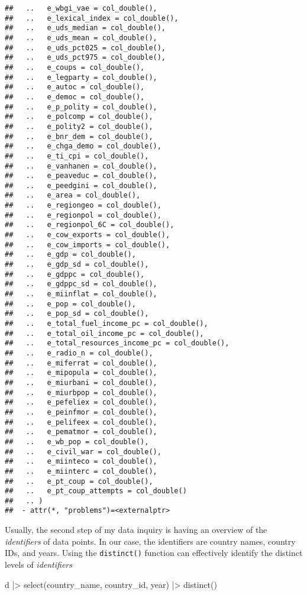 \documentclass[
]{article}
\newenvironment{Shaded}{\begin{snugshade}}{\end{snugshade}}
\newcommand{\FunctionTok}[1]{\textcolor[rgb]{0.00,0.00,0.00}{#1}}
\newcommand{\NormalTok}[1]{#1}
\newcommand{\SpecialCharTok}[1]{\textcolor[rgb]{0.00,0.00,0.00}{#1}}
\begin{document}
\begin{verbatim}
##   ..   e_wbgi_vae = col_double(),
##   ..   e_lexical_index = col_double(),
##   ..   e_uds_median = col_double(),
##   ..   e_uds_mean = col_double(),
##   ..   e_uds_pct025 = col_double(),
##   ..   e_uds_pct975 = col_double(),
##   ..   e_coups = col_double(),
##   ..   e_legparty = col_double(),
##   ..   e_autoc = col_double(),
##   ..   e_democ = col_double(),
##   ..   e_p_polity = col_double(),
##   ..   e_polcomp = col_double(),
##   ..   e_polity2 = col_double(),
##   ..   e_bnr_dem = col_double(),
##   ..   e_chga_demo = col_double(),
##   ..   e_ti_cpi = col_double(),
##   ..   e_vanhanen = col_double(),
##   ..   e_peaveduc = col_double(),
##   ..   e_peedgini = col_double(),
##   ..   e_area = col_double(),
##   ..   e_regiongeo = col_double(),
##   ..   e_regionpol = col_double(),
##   ..   e_regionpol_6C = col_double(),
##   ..   e_cow_exports = col_double(),
##   ..   e_cow_imports = col_double(),
##   ..   e_gdp = col_double(),
##   ..   e_gdp_sd = col_double(),
##   ..   e_gdppc = col_double(),
##   ..   e_gdppc_sd = col_double(),
##   ..   e_miinflat = col_double(),
##   ..   e_pop = col_double(),
##   ..   e_pop_sd = col_double(),
##   ..   e_total_fuel_income_pc = col_double(),
##   ..   e_total_oil_income_pc = col_double(),
##   ..   e_total_resources_income_pc = col_double(),
##   ..   e_radio_n = col_double(),
##   ..   e_miferrat = col_double(),
##   ..   e_mipopula = col_double(),
##   ..   e_miurbani = col_double(),
##   ..   e_miurbpop = col_double(),
##   ..   e_pefeliex = col_double(),
##   ..   e_peinfmor = col_double(),
##   ..   e_pelifeex = col_double(),
##   ..   e_pematmor = col_double(),
##   ..   e_wb_pop = col_double(),
##   ..   e_civil_war = col_double(),
##   ..   e_miinteco = col_double(),
##   ..   e_miinterc = col_double(),
##   ..   e_pt_coup = col_double(),
##   ..   e_pt_coup_attempts = col_double()
##   .. )
##  - attr(*, "problems")=<externalptr>
\end{verbatim}

Usually, the second step of my data inquiry is having an overview of the
\emph{identifiers} of data points. In our case, the identifiers are
country names, country IDs, and years. Using the \texttt{distinct()}
function can effectively identify the distinct levels of
\emph{identifiers}

\begin{Shaded}
\begin{Highlighting}[]
\NormalTok{d }\SpecialCharTok{|\textgreater{}} \FunctionTok{select}\NormalTok{(country\_name, country\_id, year) }\SpecialCharTok{|\textgreater{}} \FunctionTok{distinct}\NormalTok{()}
\end{Highlighting}
\end{Shaded}
\end{document}
